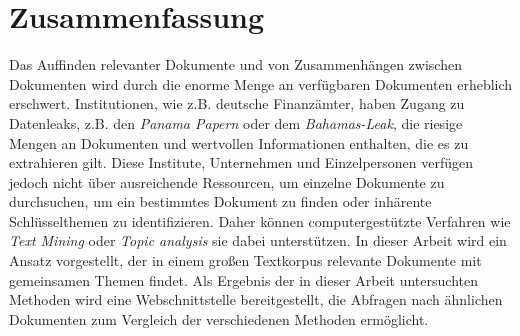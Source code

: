 \chapter*{Zusammenfassung}

Das Auffinden relevanter Dokumente und von Zusammenhängen zwischen Dokumenten wird durch die enorme Menge an verfügbaren Dokumenten erheblich erschwert.
Institutionen, wie z.B. deutsche Finanzämter, haben Zugang zu Datenleaks, z.B. den \textit{Panama Papern} oder dem \textit{Bahamas-Leak}, 
die riesige Mengen an Dokumenten und wertvollen Informationen enthalten, die es zu extrahieren gilt.
Diese Institute, Unternehmen und Einzelpersonen verfügen jedoch nicht über ausreichende Ressourcen, um einzelne Dokumente 
zu durchsuchen, um ein bestimmtes Dokument zu finden oder inhärente Schlüsselthemen zu identifizieren.
Daher können computergestützte Verfahren wie \textit{Text Mining} oder \textit{Topic analysis} sie dabei unterstützen.
In dieser Arbeit wird ein Ansatz vorgestellt, der in einem großen Textkorpus relevante Dokumente mit gemeinsamen Themen findet.
Als Ergebnis der in dieser Arbeit untersuchten Methoden wird eine Webschnittstelle bereitgestellt, die Abfragen nach ähnlichen Dokumenten 
zum Vergleich der verschiedenen Methoden ermöglicht.